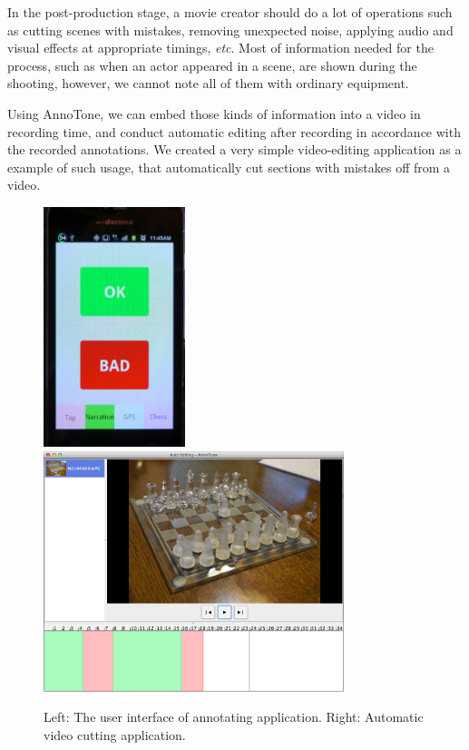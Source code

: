 In the post-production stage, a movie creator should do a lot of operations such as cutting scenes with mistakes, removing unexpected noise, applying audio and visual effects at appropriate timings, {\it etc}.
Most of information needed for the process, such as when an actor appeared in a scene, are shown during the shooting, however, we cannot note all of them with ordinary equipment.

Using AnnoTone, we can embed those kinds of information into a video in recording time, and conduct automatic editing after recording in accordance with the recorded annotations.
We created a very simple video-editing application as a example of such usage, that automatically cut sections with mistakes off from a video.

\begin{figure}[htbp]
 \begin{center}
  \includegraphics[height=70mm]{application_edit_app.png}
  \includegraphics[height=70mm]{application_edit.png}
 \end{center}
 \caption{Left: The user interface of annotating application. Right: Automatic video cutting application.}
 \label{fig:appl_edit}
\end{figure}

